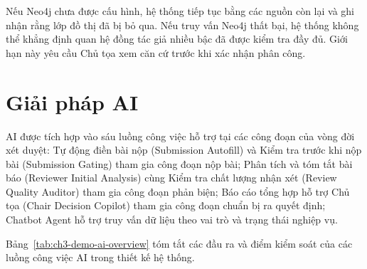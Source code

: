 Nếu Neo4j chưa được cấu hình, hệ thống tiếp tục bằng các nguồn còn lại và ghi nhận rằng lớp đồ thị đã bị bỏ qua. Nếu truy vấn Neo4j thất bại, hệ thống không thể khẳng định quan hệ đồng tác giả nhiều bậc đã được kiểm tra đầy đủ. Giới hạn này yêu cầu Chủ tọa xem căn cứ trước khi xác nhận phân công.

\section{Giải pháp AI}
\label{sec:ch3-demo-ai}

AI được tích hợp vào sáu luồng công việc hỗ trợ tại các công đoạn của vòng đời xét duyệt: Tự động điền bài nộp (Submission Autofill) và Kiểm tra trước khi nộp bài (Submission Gating) tham gia công đoạn nộp bài; Phân tích và tóm tắt bài báo (Reviewer Initial Analysis) cùng Kiểm tra chất lượng nhận xét (Review Quality Auditor) tham gia công đoạn phản biện; Báo cáo tổng hợp hỗ trợ Chủ tọa (Chair Decision Copilot) tham gia công đoạn chuẩn bị ra quyết định; Chatbot Agent hỗ trợ truy vấn dữ liệu theo vai trò và trạng thái nghiệp vụ.

Bảng~\ref{tab:ch3-demo-ai-overview} tóm tắt các đầu ra và điểm kiểm soát của các luồng công việc AI trong thiết kế hệ thống.

